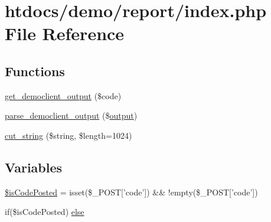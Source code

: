\hypertarget{demo_2report_2index_8php}{\section{htdocs/demo/report/index.php File Reference}
\label{demo_2report_2index_8php}
}
\subsection*{Functions}
\begin{DoxyCompactItemize}
\item 
\hyperlink{demo_2report_2index_8php_ab7bcf40c50ab09bcc2c796d606cc13a5}{get\-\_\-democlient\-\_\-output} (\$code)
\item 
\hyperlink{demo_2report_2index_8php_ac14d8fc858b649bdd8b8b1c4f19c61fa}{parse\-\_\-democlient\-\_\-output} (\$\hyperlink{testthreadexecutor_8cpp_a2369284a02343f6cea00e0e992c138ce}{output})
\item 
\hyperlink{demo_2report_2index_8php_a66fdcea7b16570f8244d938c345f12a1}{cut\-\_\-string} (\$string, \$length=1024)
\end{DoxyCompactItemize}
\subsection*{Variables}
\begin{DoxyCompactItemize}
\item 
\hyperlink{demo_2report_2index_8php_a005f06736bced8ede9bef8b0fc42966d}{\$is\-Code\-Posted} = isset(\$\-\_\-\-P\-O\-S\-T\mbox{[}'code'\mbox{]}) \&\& !empty(\$\-\_\-\-P\-O\-S\-T\mbox{[}'code'\mbox{]})
\item 
if(\$is\-Code\-Posted) \hyperlink{demo_2report_2index_8php_a63d14b9f7ac9b37e5a7aa176c88ee9f3}{else}
\end{DoxyCompactItemize}


